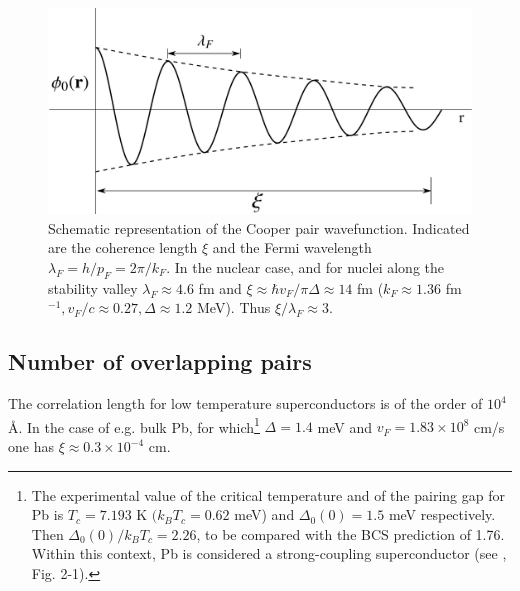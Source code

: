      
        

 \begin{figure}[h]
 	\centerline{\includegraphics*[width=12cm,angle=0	]{nutshell/figs/fig3B2}}
 	\caption{Schematic representation of the Cooper pair wavefunction. Indicated are the coherence length $\xi$ and the Fermi wavelength $\lambda_F=h/p_F=2\pi/k_F$. In the nuclear case, and for nuclei along the stability valley $\lambda_F\approx4.6$ fm and $\xi\approx \hbar v_F/\pi\Delta\approx14$ fm ($k_F\approx 1.36$ fm $^{-1}, v_F/c\approx0.27, \Delta\approx 1.2$ MeV). Thus $\xi/\lambda_F\approx 3$. }\label{fig3B2}
 \end{figure}
 





\subsection{Number of overlapping pairs}
 

The correlation length for low temperature superconductors is of the order of $10^4$\AA. In the case of e.g. bulk Pb, for which\footnote{\label{foot75}  The experimental value of the critical temperature and of the pairing gap for Pb is $T_c=7.193$ K $(k_BT_c=0.62$ meV) and $\Delta_0(0)=1.5$ meV respectively.  Then  $\Delta_0(0)/k_BT_c=2.26$, to be compared with the BCS prediction of 1.76. Within this context, Pb is considered a strong-coupling superconductor (see \cite{Tinkham:96}, Fig. 2-1).} $\Delta=1.4$ meV and $v_F=1.83\times10^8$ cm/s one has $\xi\approx0.3\times10^{-4}$ cm. 

